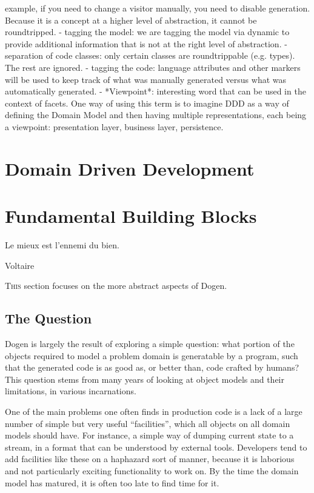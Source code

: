 \documentclass{book}
\begin{document}
    example, if you need to change a visitor manually, you need to
    disable generation. Because it is a concept at a higher level of
    abstraction, it cannot be roundtripped.
  - tagging the model: we are tagging the model via dynamic to provide
    additional information that is not at the right level of
    abstraction.
  - separation of code classes: only certain classes are
    roundtrippable (e.g. types). The rest are ignored.
  - tagging the code: language attributes and other markers will be
    used to keep track of what was manually generated versus what was
    automatically generated.
- *Viewpoint*: interesting word that can be used in the context of
  facets. One way of using this term is to imagine DDD as a way of
  defining the Domain Model and then having multiple representations,
  each being a viewpoint: presentation layer, business layer,
  persistence.

\chapter{Domain Driven Development}
\label{ddd}

\chapter{Fundamental Building Blocks}

\epigraph{Le mieux est l'ennemi du bien.}{Voltaire}

\lettrine{T}{his} section focuses on the more abstract aspects of
Dogen.

\section{The Question}

Dogen is largely the result of exploring a simple question: what
portion of the objects required to model a problem domain is
generatable by a program, such that the generated code is as good as,
or better than, code crafted by humans? This question stems from many
years of looking at object models and their limitations, in various
incarnations.

One of the main problems one often finds in production code is a lack
of a large number of simple but very useful ``facilities'', which all
objects on all domain models should have. For instance, a simple way
of dumping current state to a stream, in a format that can be
understood by external tools. Developers tend to add facilities like
these on a haphazard sort of manner, because it is laborious and not
particularly exciting functionality to work on. By the time the domain
model has matured, it is often too late to find time for it.
\end{document}
